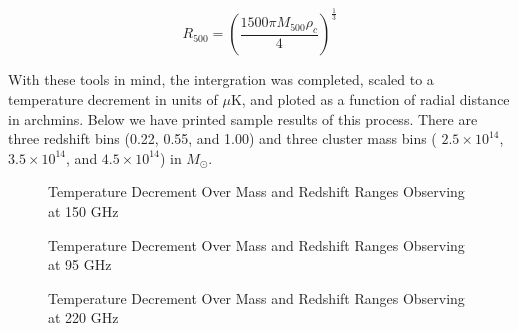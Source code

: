 \documentclass[12pt]{article} %
\begin{document}
\begin{equation}
R_{500} = (\frac{1500\pi M_{500}\rho_c}{4})^\frac{1}{3}
\end{equation}

With these tools in mind, the intergration was completed, scaled to a temperature decrement in units of $\mu$K, and ploted as a function of radial distance in archmins. Below we have printed sample results of this process. There are three redshift bins (0.22, 0.55, and 1.00) and three cluster mass bins ( $2.5\times 10^{14}$,  $3.5\times 10^{14}$, and  $4.5\times 10^{14}$) in $M_{\odot}$. 


\begin{figure}[!ht]
	\center
    \vfill
	\center
    \vfill
	\center
    \caption{Temperature Decrement Over Mass and Redshift Ranges Observing at 150 GHz}
    \label{fig:dummy}
  \end{figure}

\begin{figure}[!ht]
	\center
    \vfill
	\center
    \vfill
	\center
    \caption{Temperature Decrement Over Mass and Redshift Ranges Observing at 95 GHz }
    \label{fig:dummy}
  \end{figure}

\begin{figure}[!ht]
	\center
    \vfill
	\center
    \vfill
	\center
    \caption{Temperature Decrement Over Mass and Redshift Ranges Observing at 220 GHz }
    \label{fig:dummy}
  \end{figure}
\end{document}
